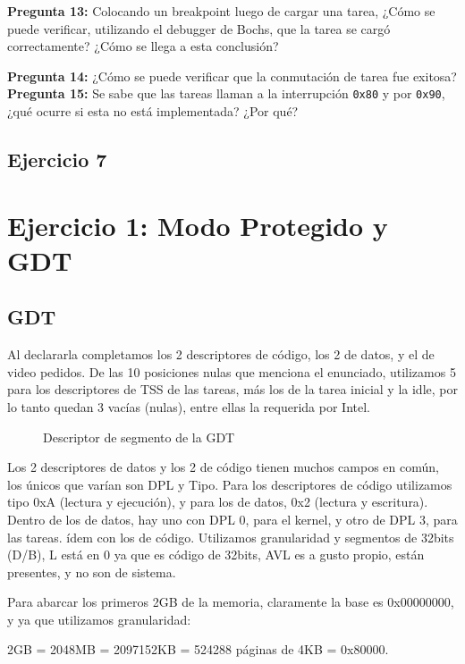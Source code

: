 \documentclass[10pt, a4paper]{article}
\begin{document}
{\textbf{Pregunta 13:}} Colocando un breakpoint luego de cargar una tarea, ¿Cómo se puede verificar, utilizando el debugger de Bochs, que la tarea se cargó correctamente?
¿Cómo se llega a esta conclusión?

{\textbf{Pregunta 14:}} ¿Cómo se puede verificar que la conmutación de tarea fue exitosa?
{\textbf{Pregunta 15:}} Se sabe que las tareas llaman a la interrupción \texttt{0x80} y por \texttt{0x90}, ¿qué ocurre si esta no está implementada? ¿Por qué?
\subsection{Ejercicio 7}


\section{Ejercicio 1: Modo Protegido y GDT}
\subsection{GDT}
Al declararla completamos los 2 descriptores de código, los 2 de datos, y el de video pedidos. De las 10 posiciones nulas que menciona el enunciado, utilizamos 5 para los descriptores de TSS de las tareas, más los de la tarea inicial y la idle, por lo tanto quedan 3 vacías (nulas), entre ellas la requerida por Intel.

		\begin{figure}[H]
	  		\centering
			\caption{Descriptor de segmento de la GDT}
			\label{fig:descriptorGDT}
		\end{figure}

Los 2 descriptores de datos y los 2 de código tienen muchos campos en común, los únicos que varían son DPL y Tipo. Para los descriptores de código utilizamos tipo 0xA (lectura y ejecución), y para los de datos, 0x2 (lectura y escritura). Dentro de los de datos, hay uno con DPL 0, para el kernel, y otro de DPL 3, para las tareas. ídem con los de código.
Utilizamos granularidad y segmentos de 32bits (D/B), L está en 0 ya que es código de 32bits, AVL es a gusto propio, están presentes, y no son de sistema.

Para abarcar los primeros 2GB de la memoria, claramente la base es 0x00000000, y ya que utilizamos granularidad:

\begin{center}
2GB = 2048MB = 2097152KB = 524288 páginas de 4KB = 0x80000.
\end{center}
\end{document}
